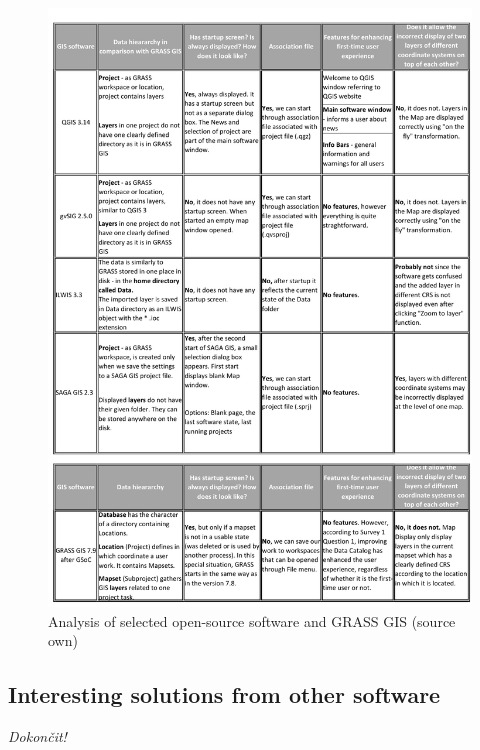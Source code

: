 \documentclass[a4paper,10pt,twoside]{article}
\begin{document}
\vspace{0.3cm}
\begin{figure}[hbt!] 
\begin{center}
\includegraphics[width=15cm]{../pictures/open-source_software.pdf} 
\caption[Analysis of selected open-source software and GRASS GIS (source own)]{Analysis of selected open-source software and GRASS GIS (source own)}
\label{fig:open-source_software}
\end{center}
\end{figure}


\newpage
\vspace*{-1cm} 
\subsection{Interesting solutions from other software}

\noindent \textit{\color{red}Dokončit!}
\end{document}
